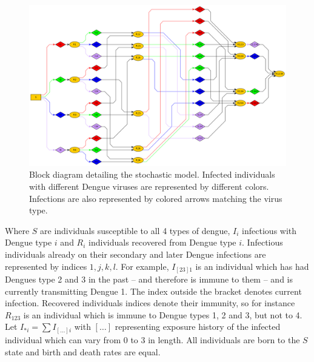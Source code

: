 \documentclass[12pt]{article}
\begin{document}
          \begin{figure}
 \centering
 \includegraphics[width=16cm]{Dengue4.png}

 \caption{Block diagram detailing the stochastic model. Infected individuals 
with different Dengue viruses are represented by different colors. Infections 
are also represented by colored arrows matching the virus type.}
 \label{fig:sde_blocks}
\end{figure}


Where $S$ are individuals susceptible to all 4 types of dengue, $I_i$ 
infectious 
with Dengue type $i$ and $R_i$ individuals recovered from Dengue type $i$. 
Infectious individuals already on their secondary and later Dengue infections 
are represented by indices ${1,j,k,l}$. For example, $I_{[23]1}$ is an 
individual 
which has had Dengues type 2 and 3 in the past -- and therefore is immune to 
them -- and is currently transmitting Dengue 1. 
The index outside the bracket 
denotes current infection. Recovered individuals indices denote their immunity, 
so for instance $R_{123}$ is an individual which is immune to Dengue types 1, 2 
and 3, but not to 4. Let $I_{*i} = \sum I_{[\ldots]i}$ with $[\ldots]$ 
representing exposure history of the infected individual which can vary from 0 
to 3 in length. 
All individuals are born to the $S$ state and birth and death 
rates are equal.
\end{document}
